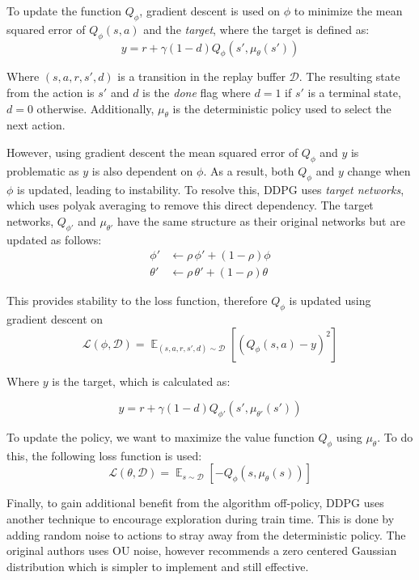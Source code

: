 \documentclass[conference]{IEEEtran}
\begin{document}
To update the function $Q_\phi$, gradient descent is used on $\phi$ to minimize the mean squared error of $Q_\phi(s, a)$ and the \textit{target}, where the target is defined as:
$$
    y = r + \gamma(1-d)Q_\phi(s', \mu_\theta(s'))
$$

Where $(s, a, r, s', d)$ is a transition in the replay buffer $\mathcal{D}$. The resulting state from the action is $s'$ and $d$ is the \textit{done} flag where $d=1$ if $s'$ is a terminal state, $d=0$ otherwise. Additionally, $\mu_\theta$ is the deterministic policy used to select the next action.

However, using gradient descent the mean squared error of $Q_\phi$ and $y$ is problematic as $y$ is also dependent on $\phi$. As a result, both $Q_\phi$ and $y$ change when $\phi$ is updated, leading to instability. To resolve this, DDPG uses \textit{target networks}, which uses polyak averaging to remove this direct dependency. The target networks, $Q_{\phi'}$ and $\mu_{\theta'}$ have the same structure as their original networks but are updated as follows:
\begin{align*}
    \phi'   & \leftarrow \rho \, \phi' + (1 - \rho) \phi     \\
    \theta' & \leftarrow \rho \, \theta' + (1 - \rho) \theta
\end{align*}

This provides stability to the loss function, therefore $Q_\phi$ is updated using gradient descent on
$$
    \mathcal{L}(\phi, \mathcal{D}) = \mathop{\mathbb{E}}_{(s,a,r,s',d) \sim \mathcal{D}}\left[\left(Q_\phi(s,a) - y\right)^2\right]
$$
\begin{flushleft}
    Where $y$ is the target, which is calculated as:
\end{flushleft}
$$
    y = r + \gamma(1-d)Q_{\phi'}(s', \mu_{\theta'}(s'))
$$

To update the policy, we want to maximize the value function $Q_\phi$ using $\mu_\theta$. To do this, the following loss function is used:
$$
    \mathcal{L}(\theta, \mathcal{D}) = \mathop{\mathbb{E}}_{s \sim \mathcal{D}}\left[-Q_\phi(s, \mu_\theta(s))\right]
$$

Finally, to gain additional benefit from the algorithm off-policy, DDPG uses another technique to encourage exploration during train time. This is done by adding random noise to actions to stray away from the deterministic policy. The original authors uses OU noise, however \cite{spinning_up_ddpg} recommends a zero centered Gaussian distribution which is simpler to implement and still effective.
\end{document}
